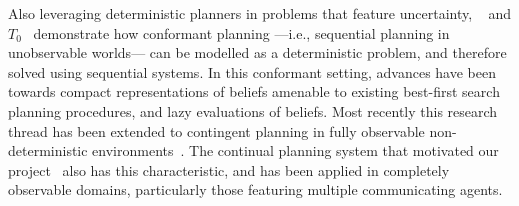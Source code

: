 


Also leveraging deterministic planners in problems that feature
uncertainty, ~\cite{hoffmann:brafman:2006} and
$T_0$~\cite{palacios:geffner:2009} demonstrate how conformant planning
---i.e., sequential planning in unobservable worlds--- can be modelled
as a deterministic problem, and therefore solved using sequential
systems. In this conformant setting, advances have been towards
compact representations of beliefs amenable to existing best-first
search planning procedures, and lazy evaluations of beliefs. Most
recently this research thread has been extended to contingent planning
in fully observable non-deterministic
environments~\cite{albore:etal:2009}.
The continual planning system that motivated our
project~\cite{brenner:nebel:jaamas09} also has this characteristic,
and has been applied in completely observable domains, particularly
those featuring multiple communicating agents. 


